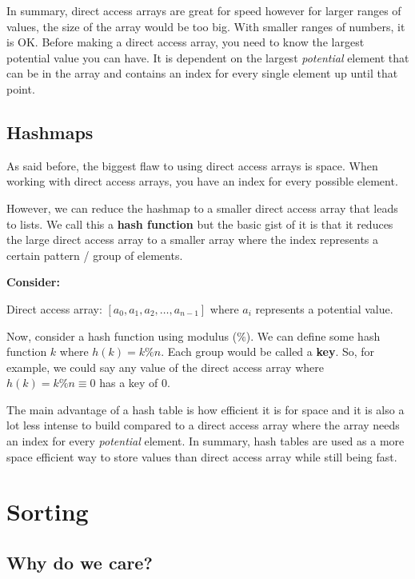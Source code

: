 \documentclass[11pt,a4paper,english]{report}
\begin{document}
\bigskip
\noindent
In summary, direct access arrays are great for speed however for larger ranges of values, the size of the array would be too big. With smaller ranges of numbers, it is OK. Before making a direct access array, you need to know the largest potential value you can have. It is dependent on the largest \textit{potential} element that can be in the array and contains an index for every single element up until that point.


\section{Hashmaps}

As said before, the biggest flaw to using direct access arrays is space. When working with direct access arrays, you have an index for every possible element.

\bigskip
\noindent
However, we can reduce the hashmap to a smaller direct access array that leads to lists. We call this a \textbf{hash function} but the basic gist of it is that it reduces the large direct access array to a smaller array where the index represents a certain pattern / group of elements.

\bigskip
\noindent 
\textbf{Consider:}

\noindent Direct access array: $[ a_0, a_1, a_2, \ldots, a_{n-1} ]$ where $a_i$ represents a potential value.

\bigskip

\noindent Now, consider a hash function using modulus ($\%$). We can define some hash function $k$ where $h(k) = k \% n$. Each group would be called a \textbf{key}. So, for example, we could say any value of the direct access array where $h(k) = k \% n \equiv 0$ has a key of 0.

\bigskip
\noindent
The main advantage of a hash table is how efficient it is for space and it is also a lot less intense to build compared to a direct access array where the array needs an index for every \textit{potential} element. In summary, hash tables are used as a more space efficient way to store values than direct access array while still being fast.


\chapter{Sorting}

\section{Why do we care?}
\end{document}
